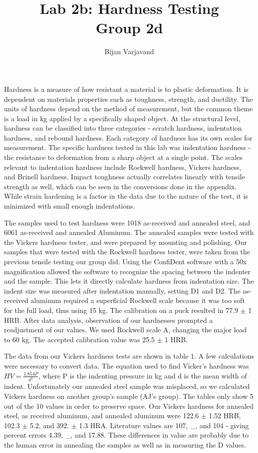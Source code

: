 \documentclass{article}
\author{Bijan Varjavand}
\title{Lab 2b: Hardness Testing\\Group 2d}
\begin{document}
\maketitle

\clearpage

Hardness is a measure of how resistant a material is to plastic deformation. It is dependent on materials properties such as toughness, strength, and ductility. The units of hardness depend on the method of measurement, but the common theme is a load in kg applied by a specifically shaped object. At the structural level, hardness can be classified into three categories - scratch hardness, indentation hardness, and rebound hardness. Each category of hardness has its own scales for measurement. The specific hardness tested in this lab was indentation hardness - the resistance to deformation from a sharp object at a single point. The scales relevant to indentation hardness include Rockwell hardness, Vickers hardness, and Brinell hardness. Impact toughness actually correlates linearly with tensile strength as well, which can be seen in the conversions done in the appendix. While strain hardening is a factor in the data due to the nature of the test, it is minimized with small enough indentations.

The samples used to test hardness were 1018 as-received and annealed steel, and 6061 as-received and annealed Aluminum. The annealed samples were tested with the Vickers hardness tester, and were prepared by mounting and polishing. Our samples that were tested with the Rockwell hardness tester, were taken from the previous tensile testing our group did. Using the ConfiDent software with a 50x magnification allowed the software to recognize the spacing between the indenter and the sample. This lets it directly calculate hardness from indentation size. The indent size was measured after indentation manually, setting D1 and D2. The as-received aluminum required a superficial Rockwell scale because it was too soft for the full load, thus using 15 kg. The calibration on a puck resulted in 77.9 $\pm$ 1 HRB. After data analysis, observation of our hardnesses prompted a readjustment of our values. We used Rockwell scale A, changing the major load to 60 kg. The accepted calibration value was 25.5 $\pm$ 1 HRB.

The data from our Vickers hardness tests are shown in table 1. A few calculations were necessary to convert data. The equation used to find Vicker's hardness was $HV=\frac{1.854P}{d^2}$, where P is the indenting pressure in kg and d is the mean width of indent. Unfortunately our annealed steel sample was misplaced, so we calculated Vickers hardness on another group's sample (AJ's group). The tables only show 5 out of the 10 values in order to preserve space. Our Vickers hardness for annealed steel, as received aluminum, and annealed aluminum were 122.6 $\pm$ 1.52 HRB, 102.3 $\pm$ 5.2, and 392. $\pm$ 1.3 HRA. Literature values are 107, \_, and 104 - giving percent errors 4.39, \_, and 17.88. These differences in value are probably due to the human error in annealing the samples as well as in measuring the D values.
\end{document}
